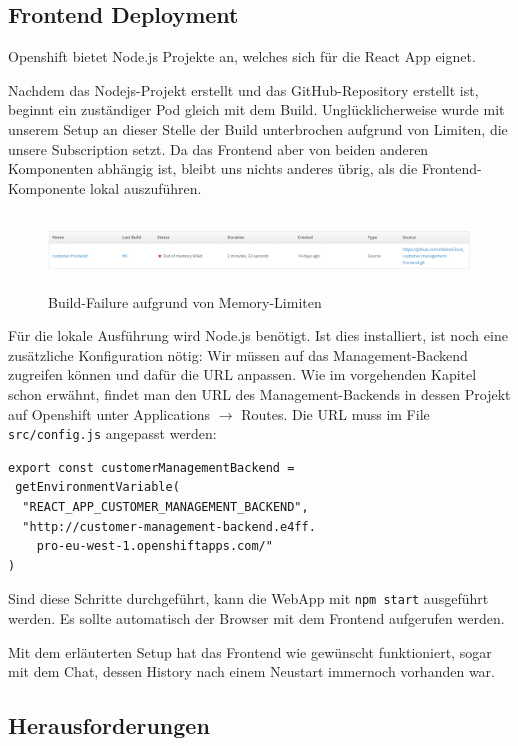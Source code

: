 \documentclass[12pt,a4paper]{article}
\begin{document}
\subsection{Frontend Deployment}\label{subsec:frontend}
Openshift bietet Node.js Projekte an, welches sich für die React App eignet. 

Nachdem das Nodejs-Projekt erstellt und das GitHub-Repository erstellt ist, beginnt ein zuständiger Pod gleich mit dem Build. Unglücklicherweise wurde mit unserem Setup an dieser Stelle der Build unterbrochen aufgrund von Limiten, die unsere Subscription setzt. Da das Frontend aber von beiden anderen Komponenten abhängig ist, bleibt uns nichts anderes übrig, als die Frontend-Komponente lokal auszuführen. 

\begin{figure}[h]
	\centering
	\includegraphics[width=1\linewidth,height=2cm]{img/os-frontend-build-fail}
	\caption{Build-Failure aufgrund von Memory-Limiten}
	\label{fig:os-frontend-build-fail}
\end{figure}

Für die lokale Ausführung wird Node.js benötigt. Ist dies installiert, ist noch eine zusätzliche Konfiguration nötig: Wir müssen auf das Management-Backend zugreifen können und dafür die URL anpassen. Wie im vorgehenden Kapitel schon erwähnt, findet man den URL des Management-Backends in dessen Projekt auf Openshift unter Applications $\rightarrow$ Routes. Die URL muss im File \texttt{src/config.js} angepasst werden:
\begin{lstlisting}[showstringspaces=false]
export const customerManagementBackend =
 getEnvironmentVariable(
  "REACT_APP_CUSTOMER_MANAGEMENT_BACKEND",
  "http://customer-management-backend.e4ff.
    pro-eu-west-1.openshiftapps.com/"
)
\end{lstlisting}
Sind diese Schritte durchgeführt, kann die WebApp mit \texttt{npm start} ausgeführt werden. Es sollte automatisch der Browser mit dem Frontend aufgerufen werden. 

Mit dem erläuterten Setup hat das Frontend wie gewünscht funktioniert, sogar mit dem Chat, dessen History nach einem Neustart immernoch vorhanden war. 

\subsection{Herausforderungen}\label{subsec:challenges}
\end{document}
